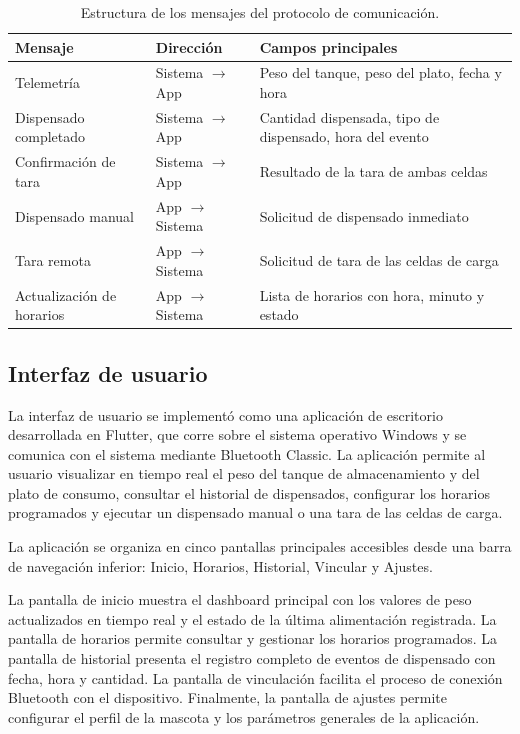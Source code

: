 \begin{table}[H]
\centering
\caption{Estructura de los mensajes del protocolo de comunicación.}
\label{tab:tramas}
\renewcommand{\arraystretch}{1.3}
\begin{tabular}{>{\raggedright\arraybackslash}p{3.5cm} l >{\raggedright\arraybackslash}p{5.5cm}}
\toprule
\textbf{Mensaje} & \textbf{Dirección} & \textbf{Campos principales} \\
\midrule
Telemetría & Sistema $\rightarrow$ App & Peso del tanque, peso del plato, fecha y hora \\
Dispensado completado & Sistema $\rightarrow$ App & Cantidad dispensada, tipo de dispensado, hora del evento \\
Confirmación de tara & Sistema $\rightarrow$ App & Resultado de la tara de ambas celdas \\
Dispensado manual & App $\rightarrow$ Sistema & Solicitud de dispensado inmediato \\
Tara remota & App $\rightarrow$ Sistema & Solicitud de tara de las celdas de carga \\
Actualización de horarios & App $\rightarrow$ Sistema & Lista de horarios con hora, minuto y estado \\
\bottomrule
\end{tabular}
\end{table}

\subsection{Interfaz de usuario}

La interfaz de usuario se implementó como una aplicación de escritorio desarrollada
en Flutter, que corre sobre el sistema operativo Windows y se comunica con el
sistema mediante Bluetooth Classic. La aplicación permite al usuario visualizar
en tiempo real el peso del tanque de almacenamiento y del plato de consumo,
consultar el historial de dispensados, configurar los horarios programados y
ejecutar un dispensado manual o una tara de las celdas de carga.

La aplicación se organiza en cinco pantallas principales accesibles desde una
barra de navegación inferior: Inicio, Horarios, Historial, Vincular y Ajustes.

La pantalla de inicio muestra el dashboard principal con los valores de
peso actualizados en tiempo real y el estado de la última alimentación registrada.
La pantalla de horarios permite consultar y gestionar los horarios programados. La pantalla de historial presenta el registro completo de eventos de dispensado con fecha, hora y cantidad. La pantalla de vinculación facilita el proceso de conexión Bluetooth con el dispositivo. Finalmente, la pantalla de
ajustes permite configurar el perfil de la mascota y los parámetros generales de la
aplicación. 


